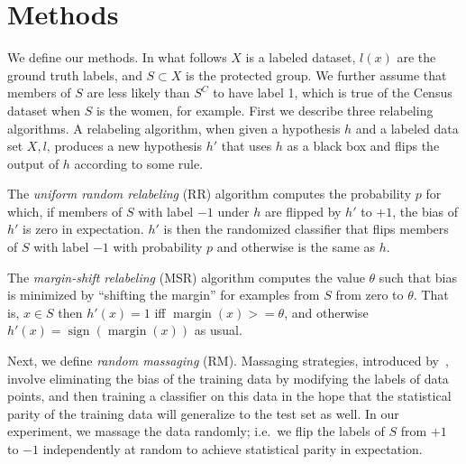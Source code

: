 \documentclass{article}
\DeclareMathOperator{\margin}{margin}
\DeclareMathOperator{\sign}{sign}
\begin{document}
\section{Methods} \label{sec:methods}

We define our methods. In what follows $X$ is a labeled dataset,
$l(x)$ are the ground truth labels, and $S \subset X$ is the protected group.
We further assume that members of $S$ are less likely than $S^C$ to have label
1, which is true of the Census dataset when $S$ is the women, for example.
First we describe three relabeling algorithms.  
A relabeling algorithm, when given a hypothesis $h$ and a labeled data set $X, l$,
produces a new hypothesis $h'$ that uses $h$ as a black box and flips the output
of $h$ according to some rule.

The \emph{uniform random relabeling} (RR) algorithm computes the probability
$p$ for which, if members of $S$ with label $-1$ under $h$ are flipped by $h'$ to $+1$,
the bias of $h'$ is zero in expectation.  $h'$ is then the randomized classifier that
flips members of $S$ with label $-1$ with probability $p$ and otherwise is the same as $h$.

% 

The \emph{margin-shift relabeling} (MSR) algorithm computes the value $\theta$
such that bias is minimized by ``shifting the margin'' for examples from $S$
from zero to $\theta$. That is, $x \in S$ then $h'(x) = 1$ iff $\margin(x) >=
\theta$, and otherwise $h'(x) = \sign(\margin(x))$ as usual. 

Next, we define \emph{random massaging} (RM).
Massaging strategies, introduced by~\citet{KamiranC09}, involve eliminating the bias of
the training data by modifying the labels of data points, and then training a
classifier on this data in the hope that the statistical parity of the training data
will generalize to the test set as well.
In our experiment, we massage the data randomly; i.e.~we flip the labels of $S$ from $+1$ to $-1$ independently at random
to achieve statistical parity in expectation.
\end{document}
